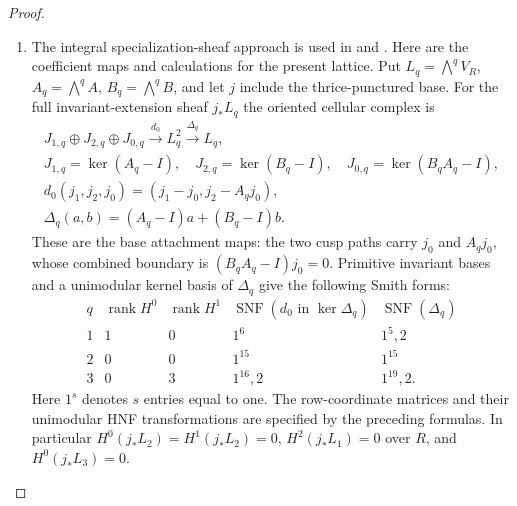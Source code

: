 \documentclass[11pt,a4paper]{article}
\numberwithin{equation}{section}
\theoremstyle{definition}
\begin{document}
\begin{proof}
\begin{enumerate}[label=\arabic*.]
Put $T=D^t$.  Its polynomial is $(x-1)\Phi_{12}(x)$, and
\[
 E=\Phi_{12}(T)=T^4-T^2+I,\qquad E^2=E,\qquad
 \sum_{j=0}^{11}T^j=12E.
\]
The image of this integral rank-one idempotent is the primitive
invariant line.  Hence the norm for every stated $m_2$ is $m_2E$.
The Wang sequence in degree two has quotient
$\operatorname{Inv}(\bigwedge^2T)$ and kernel
$\operatorname{coker}(T-I)$.  Restriction to the $m_2$-fold cover
projects identically onto the former group.  On the latter it is
the horizontal wedge with the norm: a horizontal cell lifts to
$m_2$ successive transported prisms.
Consequently the restriction image $J_2$ projects onto the vertical
invariants, and its intersection with the horizontal invariant
summand is $e_0\wedge m_2\operatorname{Inv}(T)$.
The horizontal inclusion induces the isomorphism
\[
 \frac{\operatorname{Inv}(T)}{m_2\operatorname{Inv}(T)}
 \ \xrightarrow{\ \sim\ }\\
 \frac{\operatorname{Inv}(\bigwedge^2V_R)}{J_2}
 \ \cong\ R/3^rR.
\]
At the first finite cap, $m_1$ is a unit
in $R$, so transfer and averaging give the full invariant image
and zero kernel.  At the cusp, \cref{night:P1.11} gives injective
restrictions onto the invariant lattices in degrees one, two
and three, by dualizing its saturated-kernel collapse.

\item The integral specialization-sheaf approach is used in
\cite[Lemma 7.25 and Propositions 7.26--7.27, pp.~61--63]{AC26}
and \cite[section ``The integral homology'']{E26}.
Here are the coefficient maps and calculations for the present lattice.  Put $L_q=\bigwedge^qV_R$, $A_q=\bigwedge^qA$,
$B_q=\bigwedge^qB$, and let $j$ include the thrice-punctured base.
For the full invariant-extension sheaf $j_*L_q$ the oriented
cellular complex is
\[
\begin{gathered}
 J_{1,q}\oplus J_{2,q}\oplus J_{0,q}
 \xrightarrow{d_0}L_q^2\xrightarrow{\Delta_q}L_q,\\
 J_{1,q}=\ker(A_q-I),\quad J_{2,q}=\ker(B_q-I),\quad
 J_{0,q}=\ker(B_qA_q-I),\\
 d_0(j_1,j_2,j_0)=(j_1-j_0,j_2-A_qj_0),\\
 \Delta_q(a,b)=(A_q-I)a+(B_q-I)b.
\end{gathered}
\]
These are the base attachment maps: the two cusp paths
carry $j_0$ and $A_qj_0$, whose combined boundary is
$(B_qA_q-I)j_0=0$.  Primitive invariant bases and a unimodular
kernel basis of $\Delta_q$ give the following Smith forms:
\[
\begin{array}{c|c|c|c|c}
q&\operatorname{rank}H^0&\operatorname{rank}H^1&
 \operatorname{SNF}(d_0\text{ in }\ker\Delta_q)&
 \operatorname{SNF}(\Delta_q)\\\hline
1&1&0&1^6&1^5,2\\
2&0&0&1^{15}&1^{15}\\
3&0&3&1^{16},2&1^{19},2.
\end{array}
\]
Here $1^s$ denotes $s$ entries equal to one.  The row-coordinate
matrices and their unimodular HNF transformations are specified by the preceding formulas.
In particular $H^0(j_*L_2)=H^1(j_*L_2)=0$,
$H^2(j_*L_1)=0$ over $R$, and $H^0(j_*L_3)=0$.


\end{enumerate}
\end{proof}
\end{document}

